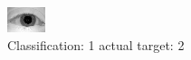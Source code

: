 \begin{figure}[h!]
\begin{center}
\includegraphics[width=0.60\columnwidth]{figures/ID947_class_1_target_2.png}
\end{center}
\caption{ Classification: 1 actual target: 2}
\label{fig:ID947_class_1_target_2}
\end{figure}
